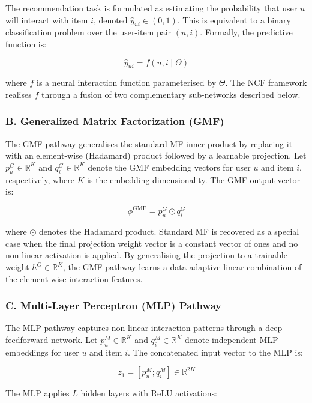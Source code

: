 \documentclass[
]{IEEEtran}
\begin{document}
The recommendation task is formulated as estimating the probability that
user \(u\) will interact with item \(i\), denoted
\(\hat{y}_{ui} \in (0, 1)\). This is equivalent to a binary
classification problem over the user-item pair \((u,i)\). Formally, the
predictive function is:

\[\hat{y}_{ui} = f(u, i \mid \Theta)\]

where \(f\) is a neural interaction function parameterised by
\(\Theta\). The NCF framework realises \(f\) through a fusion of two
complementary sub-networks described below.

\subsubsection{B. Generalized Matrix Factorization
(GMF)}\label{b.-generalized-matrix-factorization-gmf}

The GMF pathway generalises the standard MF inner product by replacing
it with an element-wise (Hadamard) product followed by a learnable
projection. Let \(p_u^G \in \mathbb{R}^K\) and
\(q_i^G \in \mathbb{R}^K\) denote the GMF embedding vectors for user
\(u\) and item \(i\), respectively, where \(K\) is the embedding
dimensionality. The GMF output vector is:

\[\phi^{\text{GMF}} = p_u^G \odot q_i^G\]

where \(\odot\) denotes the Hadamard product. Standard MF is recovered
as a special case when the final projection weight vector is a constant
vector of ones and no non-linear activation is applied. By generalising
the projection to a trainable weight \(h^G \in \mathbb{R}^K\), the GMF
pathway learns a data-adaptive linear combination of the element-wise
interaction features.

\subsubsection{C. Multi-Layer Perceptron (MLP)
Pathway}\label{c.-multi-layer-perceptron-mlp-pathway}

The MLP pathway captures non-linear interaction patterns through a deep
feedforward network. Let \(p_u^M \in \mathbb{R}^K\) and
\(q_i^M \in \mathbb{R}^K\) denote independent MLP embeddings for user
\(u\) and item \(i\). The concatenated input vector to the MLP is:

\[z_1 = [p_u^M ; q_i^M] \in \mathbb{R}^{2K}\]

The MLP applies \(L\) hidden layers with ReLU activations:
\end{document}

